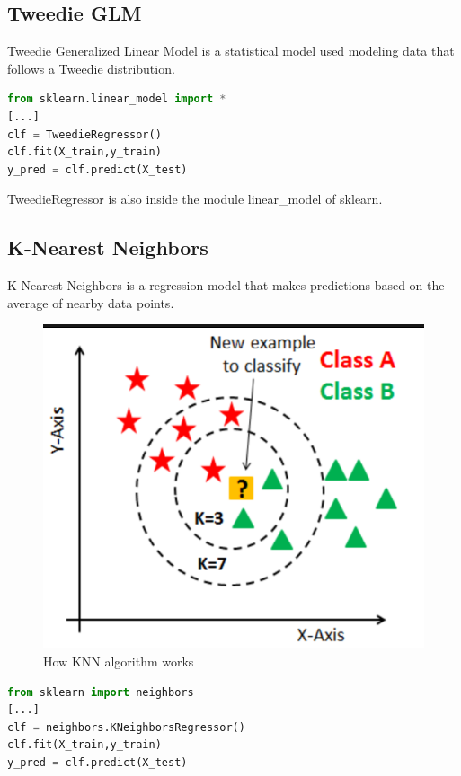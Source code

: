 \subsection{Tweedie GLM}

Tweedie Generalized Linear Model is a statistical model used modeling data that follows a Tweedie distribution. 

\begin{lstlisting}[language=Python, caption=Tweedie-GLM implementation]
from sklearn.linear_model import *
[...]
clf = TweedieRegressor()
clf.fit(X_train,y_train)
y_pred = clf.predict(X_test)
\end{lstlisting}

TweedieRegressor is also inside the module linear\_model of sklearn.

\subsection{K-Nearest Neighbors}

K Nearest Neighbors is a regression model that makes predictions based on the average of nearby data points.

\begin{figure}
    \centering
    \includegraphics[scale=0.8]{res/ML/knn.png}
    \caption{How KNN algorithm works}
\end{figure}

\begin{lstlisting}[language=Python, caption=K Nearest Neighbors implementation]
from sklearn import neighbors
[...]
clf = neighbors.KNeighborsRegressor()
clf.fit(X_train,y_train)
y_pred = clf.predict(X_test)
\end{lstlisting}

